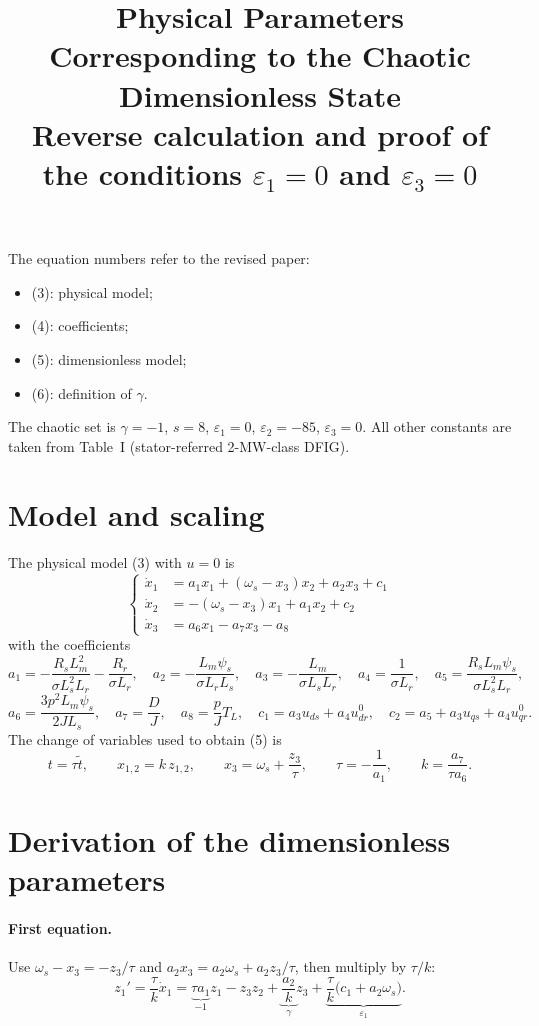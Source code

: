 \documentclass[11pt,a4paper]{article}
\title{Physical Parameters Corresponding to the Chaotic Dimensionless State\\[2pt]
\large Reverse calculation and proof of the conditions $\varepsilon_1=0$ and $\varepsilon_3=0$}
\author{}
\date{}
\begin{document}
\maketitle

The equation numbers refer to the revised paper:
\begin{itemize}
\item (3): physical model;
\item (4): coefficients;
\item (5): dimensionless model;
\item (6): definition of $\gamma$.
\end{itemize}
The chaotic set is $\gamma=-1$, $s=8$, $\varepsilon_1=0$, $\varepsilon_2=-85$, $\varepsilon_3=0$. All other constants are taken from Table~I (stator-referred 2-MW-class DFIG).

\section{Model and scaling}

The physical model (3) with $u=0$ is
\[
\left\{\begin{aligned}
\dot x_1 &= a_1x_1+(\omega_s-x_3)x_2+a_2x_3+c_1\\
\dot x_2 &= -(\omega_s-x_3)x_1+a_1x_2+c_2\\
\dot x_3 &= a_6x_1-a_7x_3-a_8
\end{aligned}\right.
\]
with the coefficients
\[
a_1=-\frac{R_sL_m^2}{\sigma L_s^2L_r}-\frac{R_r}{\sigma L_r},\quad
a_2=-\frac{L_m\psi_s}{\sigma L_rL_s},\quad
a_3=-\frac{L_m}{\sigma L_sL_r},\quad
a_4=\frac{1}{\sigma L_r},\quad
a_5=\frac{R_sL_m\psi_s}{\sigma L_s^2L_r},
\]
\[
a_6=\frac{3p^2L_m\psi_s}{2JL_s},\quad
a_7=\frac DJ,\quad
a_8=\frac pJT_L,\quad
c_1=a_3u_{ds}+a_4u^0_{dr},\quad
c_2=a_5+a_3u_{qs}+a_4u^0_{qr}.
\]
The change of variables used to obtain (5) is
\[
t=\tau\tilde t,\qquad x_{1,2}=k\,z_{1,2},\qquad x_3=\omega_s+\frac{z_3}{\tau},\qquad \tau=-\frac1{a_1},\qquad k=\frac{a_7}{\tau a_6}.
\]

\section{Derivation of the dimensionless parameters}

\paragraph{First equation.} Use $\omega_s-x_3=-z_3/\tau$ and $a_2x_3=a_2\omega_s+a_2z_3/\tau$, then multiply by $\tau/k$:
\[
z_1'=\frac{\tau}{k}\dot x_1=\underbrace{\tau a_1}_{-1}z_1-z_3z_2+\underbrace{\frac{a_2}{k}}_{\gamma}z_3+\underbrace{\frac{\tau}{k}\big(c_1+a_2\omega_s\big)}_{\varepsilon_1}.
\]
\end{document}
